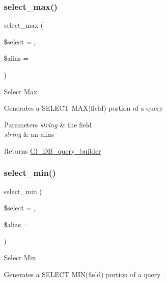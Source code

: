 \subsubsection{\texorpdfstring{select\+\_\+max()}{select\_max()}}
{\footnotesize\ttfamily select\+\_\+max (\begin{DoxyParamCaption}\item[{}]{\$select = {\ttfamily \textquotesingle{}\textquotesingle{}},  }\item[{}]{\$alias = {\ttfamily \textquotesingle{}\textquotesingle{}} }\end{DoxyParamCaption})}

Select Max

Generates a S\+E\+L\+E\+CT M\+A\+X(field) portion of a query


\begin{DoxyParams}{Parameters}
{\em string} & the field \\
\hline
{\em string} & an alias \\
\hline
\end{DoxyParams}
\begin{DoxyReturn}{Returns}
\mbox{\hyperlink{class_c_i___d_b__query__builder}{C\+I\+\_\+\+D\+B\+\_\+query\+\_\+builder}} 
\end{DoxyReturn}
\mbox{\label{class_c_i___d_b__query__builder_ab8cf650dd779435da91d6f50bf082528}} 
\subsubsection{\texorpdfstring{select\+\_\+min()}{select\_min()}}
{\footnotesize\ttfamily select\+\_\+min (\begin{DoxyParamCaption}\item[{}]{\$select = {\ttfamily \textquotesingle{}\textquotesingle{}},  }\item[{}]{\$alias = {\ttfamily \textquotesingle{}\textquotesingle{}} }\end{DoxyParamCaption})}

Select Min

Generates a S\+E\+L\+E\+CT M\+I\+N(field) portion of a query


